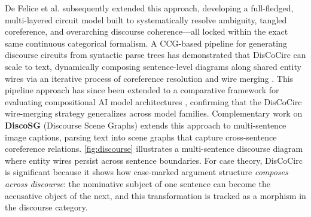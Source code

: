 \documentclass[
]{article}
\begin{document}
De Felice et al. \citeyearpar{defelice2022discocirc} subsequently
extended this approach, developing a full-fledged, multi-layered circuit
model built to systematically resolve ambiguity, tangled coreference,
and overarching discourse coherence---all locked within the exact same
continuous categorical formalism. A CCG-based pipeline for generating
discourse circuits from syntactic parse trees has demonstrated that
DisCoCirc can scale to text, dynamically composing sentence-level
diagrams along shared entity wires via an iterative process of
coreference resolution and wire merging \citeyearpar{duneau2021parsing}.
This pipeline approach has since been extended to a comparative
framework for evaluating compositional AI model architectures
\citeyearpar{duneau2025comparative}, confirming that the DisCoCirc
wire-merging strategy generalizes across model families. Complementary
work on \textbf{DiscoSG} (Discourse Scene Graphs) extends this approach
to multi-sentence image captions, parsing text into scene graphs that
capture cross-sentence coreference relations. \autoref{fig:discourse}
illustrates a multi-sentence discourse diagram where entity wires
persist across sentence boundaries. For case theory, DisCoCirc is
significant because it shows how case-marked argument structure
\emph{composes across discourse}: the nominative subject of one sentence
can become the accusative object of the next, and this transformation is
tracked as a morphism in the discourse category.
\end{document}
